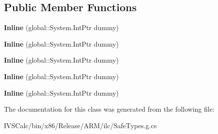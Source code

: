\subsection*{Public Member Functions}
\begin{DoxyCompactItemize}
\item 
\mbox{\label{class_windows_1_1_u_i_1_1_xaml_1_1_documents_1_1_inline_ae069a9442a6e920a3aeac6a4319a8084}} 
{\bfseries Inline} (global\+::\+System.\+Int\+Ptr dummy)
\item 
\mbox{\label{class_windows_1_1_u_i_1_1_xaml_1_1_documents_1_1_inline_ae069a9442a6e920a3aeac6a4319a8084}} 
{\bfseries Inline} (global\+::\+System.\+Int\+Ptr dummy)
\item 
\mbox{\label{class_windows_1_1_u_i_1_1_xaml_1_1_documents_1_1_inline_ae069a9442a6e920a3aeac6a4319a8084}} 
{\bfseries Inline} (global\+::\+System.\+Int\+Ptr dummy)
\item 
\mbox{\label{class_windows_1_1_u_i_1_1_xaml_1_1_documents_1_1_inline_ae069a9442a6e920a3aeac6a4319a8084}} 
{\bfseries Inline} (global\+::\+System.\+Int\+Ptr dummy)
\item 
\mbox{\label{class_windows_1_1_u_i_1_1_xaml_1_1_documents_1_1_inline_ae069a9442a6e920a3aeac6a4319a8084}} 
{\bfseries Inline} (global\+::\+System.\+Int\+Ptr dummy)
\end{DoxyCompactItemize}


The documentation for this class was generated from the following file\+:\begin{DoxyCompactItemize}
\item 
I\+V\+S\+Calc/bin/x86/\+Release/\+A\+R\+M/ilc/Safe\+Types.\+g.\+cs\end{DoxyCompactItemize}
